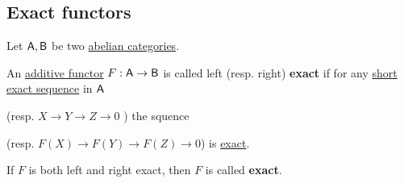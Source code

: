 \documentclass[../../../main]{subfiles}
\begin{document}
\subsection{Exact functors}
\begin{definition} \label{def:exact-complex-functor}
  Let \(\mathsf{A}, \mathsf{B}\) be two \hyperref[def:abelian-category]{abelian categories}.

  An \hyperref[def:additive-functor]{additive functor} \(F: \mathsf{A} \to \mathsf{B}\) is called left (resp. right) \textbf{exact} if for any \hyperref[def:short-exact-sequence]{short exact sequence} in \(\mathsf{A}\)
  \begin{center}
  \end{center}
  (resp. \(X \to Y \to Z \to 0\) ) the squence
  \begin{center}
  \end{center}
  (resp. \(F(X) \to F(Y) \to F(Z) \to 0\)) is \hyperref[def:short-exact-sequence]{exact}.

  If \(F\) is both left and right exact, then \(F\) is called \textbf{exact}.
\end{definition}
\end{document}
